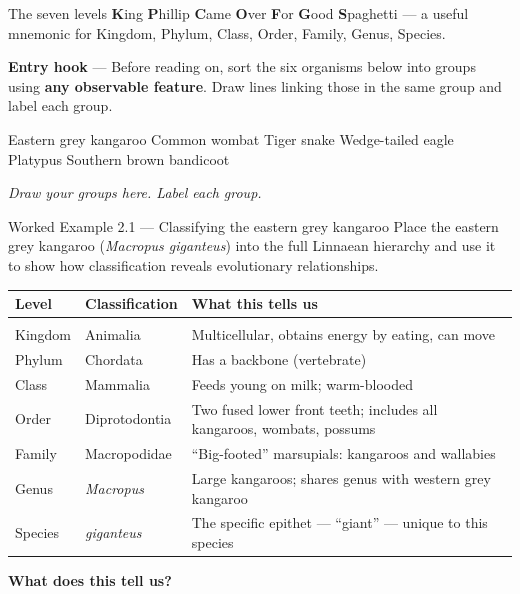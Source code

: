 \documentclass[11pt,a4paper]{article}
\begin{document}
\begin{infobox}{The seven levels}
\textbf{K}ing \textbf{P}hillip \textbf{C}ame \textbf{O}ver \textbf{F}or \textbf{G}ood \textbf{S}paghetti --- a useful mnemonic for Kingdom, Phylum, Class, Order, Family, Genus, Species.
\end{infobox}
\newpage
\begin{yr7box}
\textbf{Entry hook} --- Before reading on, sort the six organisms below into groups using \textbf{any observable feature}. Draw lines linking those in the same group and label each group.

\vspace{3pt}
\begin{center}\small
Eastern grey kangaroo \quad Common wombat \quad Tiger snake \quad Wedge-tailed eagle \quad Platypus \quad \quad Southern brown bandicoot
\end{center}

\vspace{3pt}
\begin{tcolorbox}[colback=white, colframe=MidGrey, height=3cm, boxrule=0.5pt]
\textit{\color{MidGrey}Draw your groups here. Label each group.}
\end{tcolorbox}

\vspace{5pt}

\end{yr7box}

\begin{workedex}{Worked Example 2.1 --- Classifying the eastern grey kangaroo}
	Place the eastern grey kangaroo (\textit{Macropus giganteus}) into the full Linnaean hierarchy and use it to show how classification reveals evolutionary relationships.
	
	\medskip
	\begin{tabular}{@{}L{2.8cm} L{3.8cm} L{6.5cm}@{}}
		\textbf{Level} & \textbf{Classification} & \textbf{What this tells us} \\[2pt]
		\hline\\[-6pt]
		Kingdom  & Animalia         & Multicellular, obtains energy by eating, can move \\[3pt]
		Phylum   & Chordata         & Has a backbone (vertebrate) \\[3pt]
		Class    & Mammalia         & Feeds young on milk; warm-blooded \\[3pt]
		Order    & Diprotodontia    & Two fused lower front teeth; includes all kangaroos, wombats, possums \\[3pt]
		Family   & Macropodidae     & ``Big-footed'' marsupials: kangaroos and wallabies \\[3pt]
		Genus    & \textit{Macropus}         & Large kangaroos; shares genus with western grey kangaroo \\[3pt]
		Species  & \textit{giganteus}        & The specific epithet --- ``giant'' --- unique to this species \\[3pt]
	\end{tabular}
\vspace{4pt}

\medskip
\textbf{What does this tell us?}
\end{workedex}
\end{document}
